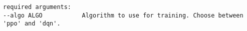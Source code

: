 \small{

    \begin{verbatim}
required arguments:
--algo ALGO           Algorithm to use for training. Choose between 'ppo' and 'dqn'.


\end{verbatim}}
